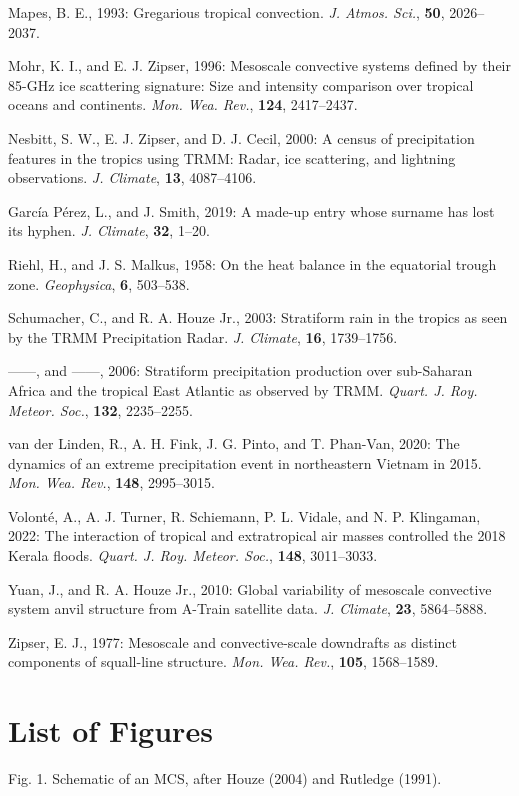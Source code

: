 \documentclass[12pt]{article}
\begin{document}
\begin{flushleft}
Mapes, B. E., 1993: Gregarious tropical convection. \textit{J. Atmos. Sci.}, \textbf{50}, 2026--2037.

Mohr, K. I., and E. J. Zipser, 1996: Mesoscale convective systems defined by their 85-GHz ice scattering signature: Size and intensity comparison over tropical oceans and continents. \textit{Mon. Wea. Rev.}, \textbf{124}, 2417--2437.

Nesbitt, S. W., E. J. Zipser, and D. J. Cecil, 2000: A census of precipitation features in the tropics using TRMM: Radar, ice scattering, and lightning observations. \textit{J. Climate}, \textbf{13}, 4087--4106.

García Pérez, L., and J. Smith, 2019: A made-up entry whose surname has lost its hyphen. \textit{J. Climate}, \textbf{32}, 1--20.

Riehl, H., and J. S. Malkus, 1958: On the heat balance in the equatorial trough zone. \textit{Geophysica}, \textbf{6}, 503--538.

Schumacher, C., and R. A. Houze Jr., 2003: Stratiform rain in the tropics as seen by the TRMM Precipitation Radar. \textit{J. Climate}, \textbf{16}, 1739--1756.

------, and ------, 2006: Stratiform precipitation production over sub-Saharan Africa and the tropical East Atlantic as observed by TRMM. \textit{Quart. J. Roy. Meteor. Soc.}, \textbf{132}, 2235--2255.

van der Linden, R., A. H. Fink, J. G. Pinto, and T. Phan-Van, 2020: The dynamics of an extreme precipitation event in northeastern Vietnam in 2015. \textit{Mon. Wea. Rev.}, \textbf{148}, 2995--3015.

Volonté, A., A. J. Turner, R. Schiemann, P. L. Vidale, and N. P. Klingaman, 2022: The interaction of tropical and extratropical air masses controlled the 2018 Kerala floods. \textit{Quart. J. Roy. Meteor. Soc.}, \textbf{148}, 3011--3033.

Yuan, J., and R. A. Houze Jr., 2010: Global variability of mesoscale convective system anvil structure from A-Train satellite data. \textit{J. Climate}, \textbf{23}, 5864--5888.

Zipser, E. J., 1977: Mesoscale and convective-scale downdrafts as distinct components of squall-line structure. \textit{Mon. Wea. Rev.}, \textbf{105}, 1568--1589.

\end{flushleft}

\clearpage
\section*{List of Figures}
Fig. 1. Schematic of an MCS, after Houze (2004) and Rutledge (1991).
\end{document}
